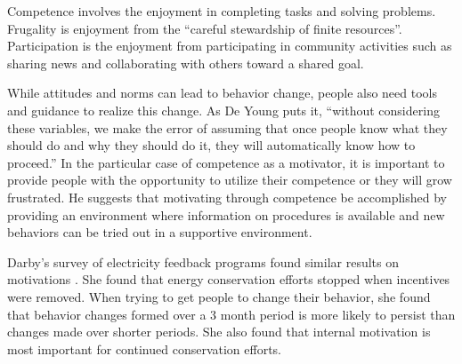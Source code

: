 Competence involves the enjoyment in completing tasks and solving problems. Frugality is enjoyment from the ``careful stewardship of finite resources''. Participation is the enjoyment from participating in community activities such as sharing news and collaborating with others toward a shared goal.

While attitudes and norms can lead to behavior change, people also need tools and guidance to realize this change. As De Young puts it, ``without considering these variables, we make the error of assuming that once people know what they should do and why they should do it, they will automatically know how to proceed.'' In the particular case of competence as a motivator, it is important to provide people with the opportunity to utilize their competence or they will grow frustrated. He suggests that motivating through competence be accomplished by providing an environment where information on procedures is available and new behaviors can be tried out in a supportive environment.

Darby's survey of electricity feedback programs found similar results on motivations \cite{darby-review-2006}. She found that energy conservation efforts stopped when incentives were removed. When trying to get people to change their behavior, she found that behavior changes formed over a 3 month period is more likely to persist than changes made over shorter periods. She also found that internal motivation is most important for continued conservation efforts.


